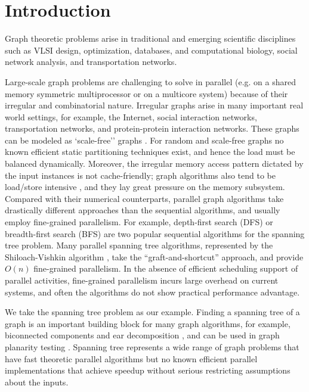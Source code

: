 
\section{Introduction}
\label{s:intr}


Graph theoretic problems arise in traditional and emerging scientific
disciplines such as VLSI design, optimization, databases, and
computational biology, social network analysis, and transportation
networks.

Large-scale graph problems are challenging to solve in parallel
(e.g.{} on a shared memory symmetric multiprocessor or on a multicore
system) because of their irregular and combinatorial nature.
Irregular graphs arise in many important real world settings, for
example, the Internet, social interaction networks, transportation
networks, and protein-protein interaction networks.  These graphs can
be modeled as `scale-free'' graphs \cite{CZF04}. For random and
scale-free graphs no known efficient static partitioning techniques exist,
and hence the load must be balanced dynamically. 
Moreover, the irregular memory access pattern dictated by the input
instances is not cache-friendly; graph algorithms also tend to be
load/store intensive \cite{G06}, and they lay great pressure on the
memory subsystem.  
Compared with their numerical counterparts, parallel
graph algorithms take drastically different approaches than the
sequential algorithms, and usually employ fine-grained
parallelism. For example, depth-first search (DFS) or breadth-first
search (BFS) are two popular sequential algorithms for the spanning
tree problem. Many parallel spanning tree algorithms, represented by
the Shiloach-Vishkin algorithm \cite{SV82}, take the
``graft-and-shortcut'' approach, and provide $O(n)$ fine-grained
parallelism. In the absence of efficient scheduling support of
parallel activities, fine-grained parallelism incurs large overhead on
current systems, and often the algorithms do not show practical
performance advantage.

We take the spanning tree problem as our example. Finding a spanning
tree of a graph is an important building block for many graph
algorithms, for example, biconnected components and ear decomposition
\cite{MR86}, and can be used in graph planarity testing \cite{KR88}.
Spanning tree represents a wide range of graph problems that have fast
theoretic parallel algorithms but no known efficient parallel
implementations that achieve speedup without serious restricting
assumptions about the inputs.

